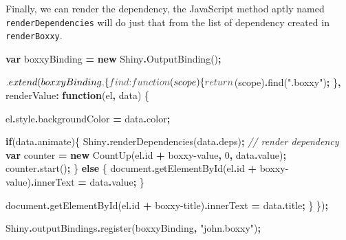 \documentclass[
]{krantz}
\makeatletter
\newenvironment{Shaded}{\begin{snugshade}}{\end{snugshade}}
\newcommand{\AttributeTok}[1]{\textcolor[rgb]{0.61,0.61,0.61}{#1}}
\newcommand{\BuiltInTok}[1]{#1}
\newcommand{\CommentTok}[1]{\textcolor[rgb]{0.37,0.37,0.37}{\textit{#1}}}
\newcommand{\ControlFlowTok}[1]{\textcolor[rgb]{0.27,0.27,0.27}{\textbf{#1}}}
\newcommand{\DataTypeTok}[1]{\textcolor[rgb]{0.27,0.27,0.27}{#1}}
\newcommand{\DecValTok}[1]{\textcolor[rgb]{0.06,0.06,0.06}{#1}}
\newcommand{\FunctionTok}[1]{\textcolor[rgb]{0,0,0}{#1}}
\newcommand{\KeywordTok}[1]{\textcolor[rgb]{0.27,0.27,0.27}{\textbf{#1}}}
\newcommand{\NormalTok}[1]{#1}
\newcommand{\OperatorTok}[1]{\textcolor[rgb]{0.43,0.43,0.43}{\textbf{#1}}}
\newcommand{\StringTok}[1]{\textcolor[rgb]{0.5,0.5,0.5}{#1}}
\newenvironment{kframe}{%
\medskip{}
\setlength{\fboxsep}{.8em}
 \def\at@end@of@kframe{}%
 \ifinner\ifhmode%
  \def\at@end@of@kframe{\end{minipage}}%
  \begin{minipage}{\columnwidth}%
 \fi\fi%
 \def\FrameCommand##1{\hskip\@totalleftmargin \hskip-\fboxsep
 \colorbox{shadecolor}{##1}\hskip-\fboxsep
     \hskip-\linewidth \hskip-\@totalleftmargin \hskip\columnwidth}%
 \MakeFramed {\advance\hsize-\width
   \@totalleftmargin\z@ \linewidth\hsize
   \@setminipage}}%
 {\par\unskip\endMakeFramed%
 \at@end@of@kframe}
\renewenvironment{Shaded}{\begin{kframe}}{\end{kframe}}
\makeatother
\begin{document}
Finally, we can render the dependency, the JavaScript method aptly named \texttt{renderDependencies} will do just that from the list of dependency created in \texttt{renderBoxxy}.

\begin{Shaded}
\begin{Highlighting}[]
\KeywordTok{var}\NormalTok{ boxxyBinding }\OperatorTok{=} \KeywordTok{new}\NormalTok{ Shiny}\OperatorTok{.}\FunctionTok{OutputBinding}\NormalTok{()}\OperatorTok{;}

\NormalTok{$}\OperatorTok{.}\FunctionTok{extend}\NormalTok{(boxxyBinding}\OperatorTok{,}\NormalTok{ \{}
  \DataTypeTok{find}\OperatorTok{:} \KeywordTok{function}\NormalTok{(scope) \{}
    \ControlFlowTok{return}\NormalTok{ $(scope)}\OperatorTok{.}\FunctionTok{find}\NormalTok{(}\StringTok{".boxxy"}\NormalTok{)}\OperatorTok{;}
\NormalTok{  \}}\OperatorTok{,}
  \DataTypeTok{renderValue}\OperatorTok{:} \KeywordTok{function}\NormalTok{(el}\OperatorTok{,}\NormalTok{ data) \{}

\NormalTok{    el}\OperatorTok{.}\AttributeTok{style}\OperatorTok{.}\AttributeTok{backgroundColor} \OperatorTok{=}\NormalTok{ data}\OperatorTok{.}\AttributeTok{color}\OperatorTok{;}

    \ControlFlowTok{if}\NormalTok{(data}\OperatorTok{.}\AttributeTok{animate}\NormalTok{)\{}
\NormalTok{      Shiny}\OperatorTok{.}\FunctionTok{renderDependencies}\NormalTok{(data}\OperatorTok{.}\AttributeTok{deps}\NormalTok{)}\OperatorTok{;} \CommentTok{// render dependency}
      \KeywordTok{var}\NormalTok{ counter }\OperatorTok{=} \KeywordTok{new}\NormalTok{ CountUp(el}\OperatorTok{.}\AttributeTok{id} \OperatorTok{+} \StringTok{\textquotesingle{}{-}boxxy{-}value\textquotesingle{}}\OperatorTok{,} \DecValTok{0}\OperatorTok{,}\NormalTok{ data}\OperatorTok{.}\AttributeTok{value}\NormalTok{)}\OperatorTok{;}
\NormalTok{      counter}\OperatorTok{.}\FunctionTok{start}\NormalTok{()}\OperatorTok{;}
\NormalTok{    \} }\ControlFlowTok{else}\NormalTok{ \{}
      \BuiltInTok{document}\OperatorTok{.}\FunctionTok{getElementById}\NormalTok{(el}\OperatorTok{.}\AttributeTok{id} \OperatorTok{+} \StringTok{\textquotesingle{}{-}boxxy{-}value\textquotesingle{}}\NormalTok{)}\OperatorTok{.}\AttributeTok{innerText} \OperatorTok{=}\NormalTok{ data}\OperatorTok{.}\AttributeTok{value}\OperatorTok{;}
\NormalTok{    \}}

    \BuiltInTok{document}\OperatorTok{.}\FunctionTok{getElementById}\NormalTok{(el}\OperatorTok{.}\AttributeTok{id} \OperatorTok{+} \StringTok{\textquotesingle{}{-}boxxy{-}title\textquotesingle{}}\NormalTok{)}\OperatorTok{.}\AttributeTok{innerText} \OperatorTok{=}\NormalTok{ data}\OperatorTok{.}\AttributeTok{title}\OperatorTok{;}
\NormalTok{  \}}
\NormalTok{\})}\OperatorTok{;}

\NormalTok{Shiny}\OperatorTok{.}\AttributeTok{outputBindings}\OperatorTok{.}\FunctionTok{register}\NormalTok{(boxxyBinding}\OperatorTok{,} \StringTok{"john.boxxy"}\NormalTok{)}\OperatorTok{;}
\end{Highlighting}
\end{Shaded}
\end{document}
